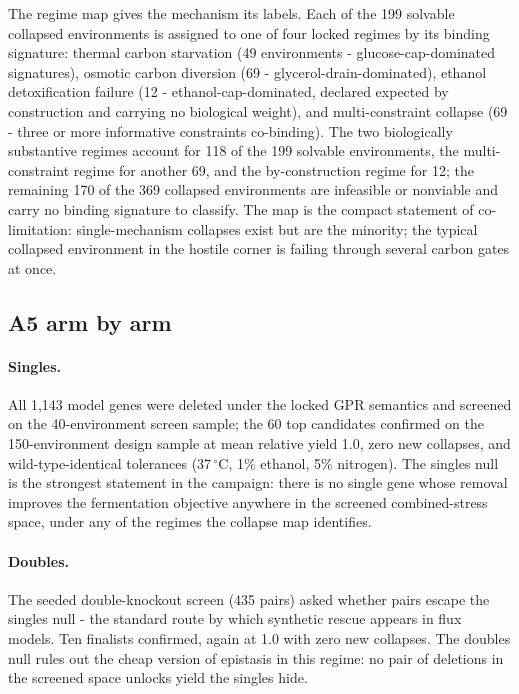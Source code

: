 \documentclass[12pt]{article}
\begin{document}
The regime map gives the mechanism its labels. Each of the 199
solvable collapsed environments is assigned to one of four locked
regimes by its binding signature: thermal carbon starvation (49
environments - glucose-cap-dominated signatures), osmotic carbon
diversion (69 - glycerol-drain-dominated), ethanol detoxification
failure (12 - ethanol-cap-dominated, declared expected by
construction and carrying no biological weight), and multi-constraint
collapse (69 - three or more informative constraints co-binding).
The two biologically substantive regimes account for 118 of the 199
solvable environments, the multi-constraint regime for another 69,
and the by-construction regime for 12; the remaining 170 of the 369
collapsed environments are infeasible or nonviable and carry no
binding signature to classify. The map is the compact statement of
co-limitation: single-mechanism collapses exist but are the minority;
the typical collapsed environment in the hostile corner is failing
through several carbon gates at once.

\subsection{A5 arm by arm}

\paragraph{Singles.} All 1{,}143 model genes were deleted under the
locked GPR semantics and screened on the 40-environment screen
sample; the 60 top candidates confirmed on the 150-environment design
sample at mean relative yield 1.0, zero new collapses, and
wild-type-identical tolerances (37\,$^{\circ}$C, 1\% ethanol, 5\%
nitrogen). The singles null is the strongest statement in the
campaign: there is no single gene whose removal improves the
fermentation objective anywhere in the screened combined-stress
space, under any of the regimes the collapse map identifies.

\paragraph{Doubles.} The seeded double-knockout screen (435 pairs)
asked whether pairs escape the singles null - the standard route by
which synthetic rescue appears in flux models. Ten finalists
confirmed, again at 1.0 with zero new collapses. The doubles null
rules out the cheap version of epistasis in this regime: no pair of
deletions in the screened space unlocks yield the singles hide.
\end{document}
